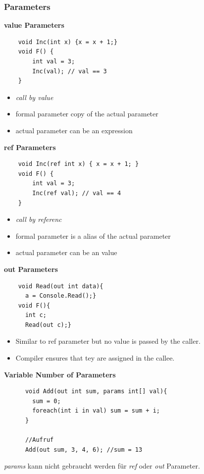 \subsubsection{Parameters}

\textbf{value Parameters}
\begin{multicols}{2}
	\begin{lstlisting}
	void Inc(int x) {x = x + 1;}
	void F() {
		int val = 3;
		Inc(val); // val == 3
	}
	\end{lstlisting}
	\columnbreak
	\begin{itemize}
		\item \textit{call by value}
		\item formal parameter copy of the actual parameter
		\item actual parameter can be an expression
	\end{itemize}
\end{multicols}

\textbf{ref Parameters}
\begin{multicols}{2}
	\begin{lstlisting}
	void Inc(ref int x) { x = x + 1; }
	void F() {
		int val = 3;
		Inc(ref val); // val == 4
	}
	\end{lstlisting}
	\columnbreak
	\begin{itemize}
		\item \textit{call by referenc}
		\item formal parameter is a alias of the actual parameter
		\item actual parameter can be an value
	\end{itemize}
\end{multicols}

\textbf{out Parameters}
\begin{multicols}{2}
  \begin{lstlisting}
    void Read(out int data){
      a = Console.Read();}
    void F(){
      int c;
      Read(out c);}
  \end{lstlisting}

\columnbreak
  
  \begin{itemize}
    \item Similar to ref parameter but no value is passed by the caller.
    \item Compiler ensures that tey are assigned in the callee.
  \end{itemize}
\end{multicols}

\textbf{Variable Number of Parameters}
\begin{multicols}{2}
	\begin{lstlisting}
	  void Add(out int sum, params int[] val){
	    sum = 0;
	    foreach(int i in val) sum = sum + i;
	  }
	  
	  //Aufruf
	  Add(out sum, 3, 4, 6); //sum = 13
	\end{lstlisting}

\columnbreak

  \textit{params} kann nicht gebraucht werden für \textit{ref} oder \textit{out} Parameter.
\end{multicols}

